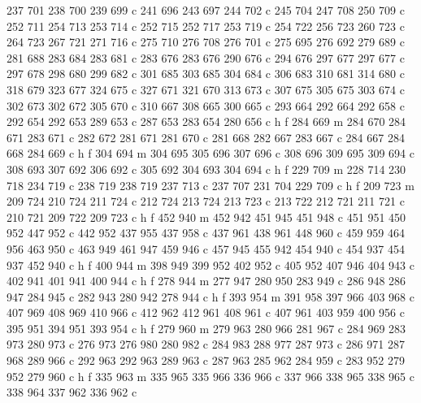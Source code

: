 {{        237 701 238 700 239 699 c
        241 696 243 697 244 702 c
        245 704 247 708 250 709 c
        252 711 254 713 253 714 c
        252 715 252 717 253 719 c
        254 722 256 723 260 723 c
        264 723 267 721 271 716 c
        275 710 276 708 276 701 c
        275 695 276 692 279 689 c
        281 688 283 684 283 681 c
        283 676 283 676 290 676 c
        294 676 297 677 297 677 c
        297 678 298 680 299 682 c
        301 685 303 685 304 684 c
        306 683 310 681 314 680 c
        318 679 323 677 324 675 c
        327 671 321 670 313 673 c
        307 675 305 675 303 674 c
        302 673 302 672 305 670 c
        310 667 308 665 300 665 c
        293 664 292 664 292 658 c
        292 654 292 653 289 653 c
        287 653 283 654 280 656 c
        h f
        284 669 m
        284 670 284 671 283 671 c
        282 672 281 671 281 670 c
        281 668 282 667 283 667 c
        284 667 284 668 284 669 c
        h f
        304 694 m
        304 695 305 696 307 696 c
        308 696 309 695 309 694 c
        308 693 307 692 306 692 c
        305 692 304 693 304 694 c
        h f
        229 709 m
        228 714 230 718 234 719 c
        238 719 238 719 237 713 c
        237 707 231 704 229 709 c
        h f
        209 723 m
        209 724 210 724 211 724 c
        212 724 213 724 213 723 c
        213 722 212 721 211 721 c
        210 721 209 722 209 723 c
        h f
        452 940 m
        452 942 451 945 451 948 c
        451 951 450 952 447 952 c
        442 952 437 955 437 958 c
        437 961 438 961 448 960 c
        459 959 464 956 463 950 c
        463 949 461 947 459 946 c
        457 945 455 942 454 940 c
        454 937 454 937 452 940 c
        h f
        400 944 m
        398 949 399 952 402 952 c
        405 952 407 946 404 943 c
        402 941 401 941 400 944 c
        h f
        278 944 m
        277 947 280 950 283 949 c
        286 948 286 947 284 945 c
        282 943 280 942 278 944 c
        h f
        393 954 m
        391 958 397 966 403 968 c
        407 969 408 969 410 966 c
        412 962 412 961 408 961 c
        407 961 403 959 400 956 c
        395 951 394 951 393 954 c
        h f
        279 960 m
        279 963 280 966 281 967 c
        284 969 283 973 280 973 c
        276 973 276 980 280 982 c
        284 983 288 977 287 973 c
        286 971 287 968 289 966 c
        292 963 292 963 289 963 c
        287 963 285 962 284 959 c
        283 952 279 952 279 960 c
        h f
        335 963 m
        335 965 335 966 336 966 c
        337 966 338 965 338 965 c
        338 964 337 962 336 962 c
}}

